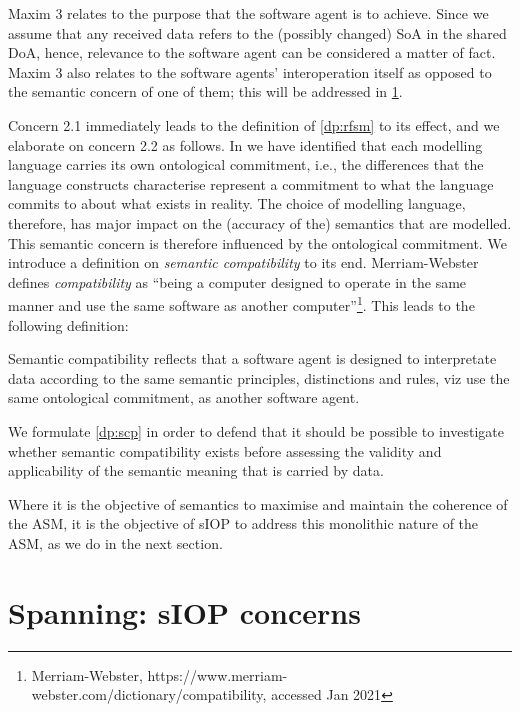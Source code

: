 \documentclass[sort&compress,preprint,authoryear,3p,twocolumn]{elsarticle}
\begin{document}
Maxim 3 relates to the purpose that the software agent is to achieve.
Since we assume that any received data refers to the (possibly changed)
SoA in the shared DoA, hence, relevance to the software agent can be
considered a matter of fact. Maxim 3 also relates to the software
agents' interoperation itself as opposed to the semantic concern of one
of them; this will be addressed in \cref{spanning-siop-concerns}.

Concern 2.1 immediately leads to the definition of \cref{dp:rfsm} to its
effect, and we elaborate on concern 2.2 as follows. In
\citep{Brandt2021a} we have identified that each modelling language
carries its own ontological commitment, i.e., the differences that the
language constructs characterise represent a commitment to what the
language commits to about what exists in reality. The choice of
modelling language, therefore, has major impact on the (accuracy of the)
semantics that are modelled. This semantic concern is therefore
influenced by the ontological commitment. We introduce a definition on
\emph{semantic compatibility} to its end. Merriam-Webster defines
\emph{compatibility} as ``being a computer designed to operate in the
same manner and use the same software as another computer''\footnote{Merriam-Webster,
  https://www.merriam-webster.com/dictionary/compatibility, accessed Jan
  2021}. This leads to the following definition:

\begin{mmdef}\label{def:semantic-compatibility}
Semantic compatibility reflects that a software agent is designed to interpretate data according to the same semantic principles, distinctions and rules, viz use the same ontological commitment, as another software agent. 
\end{mmdef}

We formulate \cref{dp:scp} in order to defend that it should be possible
to investigate whether semantic compatibility exists before assessing
the validity and applicability of the semantic meaning that is carried
by data.

Where it is the objective of semantics to maximise and maintain the
coherence of the ASM, it is the objective of sIOP to address this
monolithic nature of the ASM, as we do in the next section.

\hypertarget{spanning-siop-concerns}{%
\section{Spanning: sIOP concerns}\label{spanning-siop-concerns}}
\end{document}

